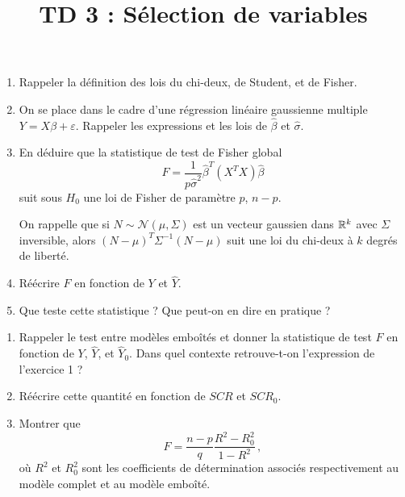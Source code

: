 \documentclass{td_um}
\title{TD 3 : Sélection de variables}
\providecommand{\1}{\mathds{1}}
\begin{document}
	\maketitle
	
	\begin{enumerate}
		\item Rappeler la définition des lois du chi-deux, de Student, et de Fisher.
		\item On se place dans le cadre d'une régression linéaire gaussienne multiple $Y = X \beta + \varepsilon$. Rappeler les expressions et les lois de $\hat \beta$ et $\hat \sigma$.
		\item En déduire que la statistique de test de Fisher global
		\[
		F = \dfrac{1}{p \hat \sigma^2} \hat \beta^T (X^TX) \hat \beta
		\]
		suit sous $H_0$ une loi de Fisher de paramètre $p$, $n-p$.
		
		On rappelle que si $N \sim \mathcal{N}(\mu, \Sigma)$ est un vecteur gaussien dans $\mathbb{R}^k$ avec $\Sigma$ inversible, alors $(N-\mu)^T \Sigma^{-1} (N-\mu)$ suit une loi du chi-deux à $k$ degrés de liberté.
		\item Réécrire $F$ en fonction de $Y$ et $\hat Y$.
		\item Que teste cette statistique ? Que peut-on en dire en pratique ?
	\end{enumerate}


	
	\begin{enumerate}
		\item Rappeler le test entre modèles emboîtés et donner la statistique de test $F$ en fonction de $Y$, $\hat Y$, et $\hat Y_0$. Dans quel contexte retrouve-t-on l'expression de l'exercice 1 ?
		\item Réécrire cette quantité en fonction de $SCR$ et $SCR_0$.
		\item Montrer que
		\[
		F = \dfrac{n-p}{q} \dfrac{R^2 - R_0^2}{1-R^2}\,,
		\]
		où $R^2$ et $R_0^2$ sont les coefficients de détermination associés respectivement au modèle complet et au modèle emboîté.
	\end{enumerate}

	
\end{document}
